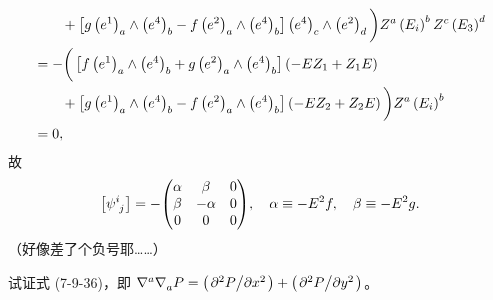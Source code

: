 \begin{xiti}
\begin{zm}
\begin{align*}
			&\qquad {}+ \left[ g \tensor{\left( e^1 \right)}{_a} \wedge \tensor{\left( e^4 \right)}{_b} - f \tensor{\left( e^2 \right)}{_a} \wedge \tensor{\left( e^4 \right)}{_b} \right] \tensor{\left( e^4 \right)}{_c} \wedge \tensor{\left( e^2 \right)}{_d} \bigg) \tensor{Z}{^a} \tensor{\left( E_i \right)}{^b} \tensor{Z}{^c} \tensor{\left( E_3 \right)}{^d}\\
			&= - \bigg( \left[ f \tensor{\left( e^1 \right)}{_a} \wedge \tensor{\left( e^4 \right)}{_b} + g \tensor{\left( e^2 \right)}{_a} \wedge \tensor{\left( e^4 \right)}{_b} \right] \left( - E Z_1 + Z_1 E \right)\\
			&\qquad {} + \left[ g \tensor{\left( e^1 \right)}{_a} \wedge \tensor{\left( e^4 \right)}{_b} - f \tensor{\left( e^2 \right)}{_a} \wedge \tensor{\left( e^4 \right)}{_b} \right] \left( - E Z_2 + Z_2 E \right) \bigg) \tensor{Z}{^a} \tensor{\left( E_i \right)}{^b}\\
			&= 0,
		\end{align*}
		故
		\begin{equation*}
			\left[ \tensor{\psi}{^i_j} \right] = - \mqty(
				\alpha & \beta & 0 \\
				\beta & -\alpha & 0\\
				0 & 0 & 0
			)
			\qc \alpha \equiv - E^2 f \qc \beta \equiv - E^2 g.
		\end{equation*}
		（好像差了个负号耶……）
	\end{zm}

	\item 试证式 (7-9-36)，即 $\tensor{\nabla}{^a} \tensor{\nabla}{_a} P = \left( \pdv*[2]{P}{x} \right) + \left( \pdv*[2]{P}{y} \right)$。
	

\end{xiti}
